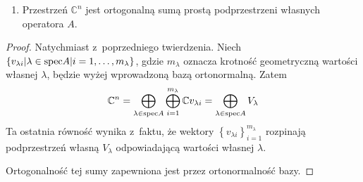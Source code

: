 \documentclass{article}
\begin{document}
\begin{enumerate}
\begin{proof}
\begin{itemize}
Rozważmy działanie operatora $A$ na dowolnym wektorze $v$:
\[
Av = A\left(\alpha{}w+v'\right) = A\left(\alpha{}w\right) + Av' = 
\alpha\lambda{}w + A'v'
\]
gdzie operator $A'$ to operator $A$ obcięty do podprzestrzeni
$\left(\mathbb{C}w\right)^\perp$, wartości $A'$ również są z~tego zbioru
(z~niezmienniczości dziedziny).

Ale $\dim\left(\mathbb{C}w\right)^\perp = n$, czyli przestrzeń 
$\left(\mathbb{C}w\right)^\perp$ jest izomorficzna z~przestrzenią $\mathbb{C}^n$,
więc na mocy założenia indukcyjnego ma bazę ortonormalną $E$, złożoną z~wektorów
własnych operatora $A'$, które również są wektorami własnymi operatora $A$.

Wektor $w$ jest prostopadły do wszystkich wektorów 
z~$\left(\mathbb{C}w\right)^\perp$, w~szczególności do wektorów z~$E$, więc układ
$E\cup\left\{w\right\}$ tworzy bazę ortonormalną przestrzeni $\mathbb{C}^{n+1}$
złożoną z~wektorów własnych operatora $A$.
\end{itemize}
\end{proof}

\item
Przestrzeń $\mathbb{C}^n$ jest ortogonalną sumą prostą podprzestrzeni własnych
operatora $A$.
\end{enumerate}

\begin{proof}Natychmiast z~poprzedniego twierdzenia. 
Niech $\left\{v_{\lambda i} | \lambda\in{\rm spec}A | i=1,\ldots,m_\lambda\right\}$,
gdzie $m_\lambda$ oznacza krotność geometryczną wartości własnej $\lambda$,
będzie wyżej wprowadzoną bazą ortonormalną. Zatem
\[
\mathbb{C}^n = \bigoplus\limits_{\lambda\in{\rm spec}A}\bigoplus\limits_{i=1}^{m_\lambda}
	\mathbb{C}v_{\lambda i} =
\bigoplus\limits_{\lambda\in{\rm spec}A}V_\lambda
\]
Ta ostatnia równość wynika z~faktu, że wektory
$\left\{v_{\lambda i}\right\}_{i=1}^{m_\lambda}$ rozpinają podprzestrzeń własną $V_\lambda$
odpowiadającą wartości własnej $\lambda$. 

Ortogonalność tej sumy zapewniona jest przez ortonormalność bazy.
\end{proof}
\end{document}

